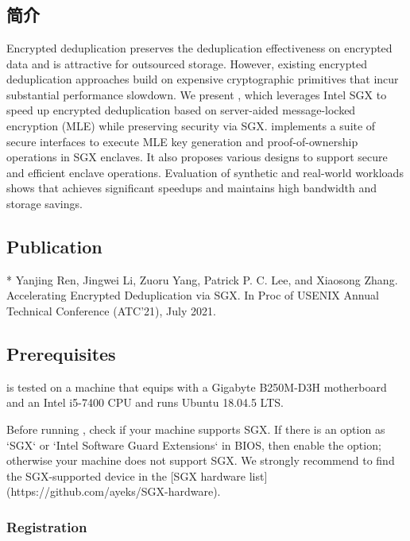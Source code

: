 \chapter{}
\section{简介}

Encrypted deduplication preserves the deduplication effectiveness on encrypted data and is attractive for outsourced storage.  However, existing encrypted deduplication approaches build on expensive cryptographic primitives that incur substantial performance slowdown.  We present \sysnameS, which leverages Intel SGX to speed up encrypted deduplication based on server-aided message-locked encryption (MLE) while preserving security via SGX.  \sysnameS implements a suite of secure interfaces to execute MLE key generation and proof-of-ownership operations in SGX enclaves.  It also proposes various designs to support secure and efficient enclave operations.  Evaluation of synthetic and real-world workloads shows that \sysnameS achieves significant speedups and maintains high bandwidth and storage savings.

\section{Publication}

* Yanjing Ren, Jingwei Li, Zuoru Yang, Patrick P. C. Lee, and Xiaosong Zhang. Accelerating Encrypted Deduplication via SGX. In Proc of USENIX Annual Technical Conference (ATC'21), July 2021.

\section{Prerequisites}

\sysnameS is tested on a machine that equips with a Gigabyte B250M-D3H motherboard and an Intel i5-7400 CPU and runs Ubuntu 18.04.5 LTS.

Before running \sysnameS, check if your machine supports SGX. If there is an option as `SGX` or `Intel Software Guard Extensions` in BIOS, then enable the option; otherwise your machine does not support SGX.
We strongly recommend to find the SGX-supported device in the [SGX hardware list](https://github.com/ayeks/SGX-hardware).

\subsection{Registration}

